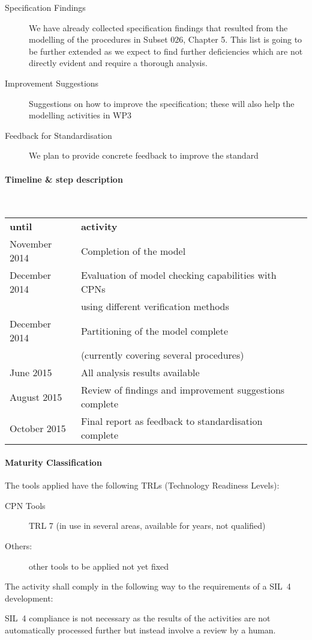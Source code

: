 \begin{description}
  \item[Specification Findings] We have already collected specification findings that resulted from the modelling of the procedures in Subset 026, Chapter 5. This list is going to be further extended as we expect to find further deficiencies which are not directly evident and require a thorough analysis.
  \item[Improvement Suggestions] Suggestions on how to improve the specification; these will also help the modelling activities in WP3
  \item[Feedback for Standardisation] We plan to provide concrete feedback to improve the standard
\end{description}

\paragraph{Timeline \& step description}
~\\
\begin{tabular}{ll}
  \textbf{until}&\textbf{activity}\\
  November 2014 & Completion of the model\\
  December 2014 & Evaluation of model checking capabilities with CPNs\\& using different verification methods\\
  December 2014 & Partitioning of the model complete\\&(currently covering several procedures)\\
  June 2015 & All analysis results available\\
  August 2015 & Review of findings and improvement suggestions complete\\
  October 2015 & Final report as feedback to standardisation complete\\
\end{tabular}


\paragraph{Maturity Classification}

The tools applied have the following TRLs (Technology Readiness
Levels):
\begin{description}
\item[CPN Tools] TRL 7 (in use in several areas, available for years, not qualified)
\item[Others:] other tools to be applied not yet fixed
\end{description}

The activity shall comply in the following way to the requirements of
a SIL~4 development:

SIL~4 compliance is not necessary as the results of the activities are not automatically processed further but instead involve a review by a human.
